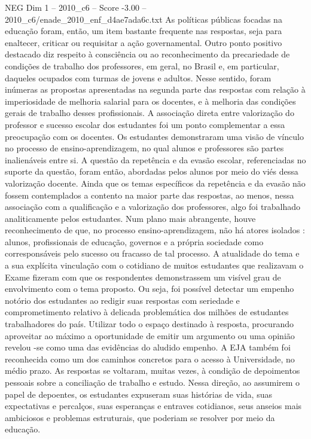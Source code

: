 \begin{textsample}{NEG Dim 1 – 2010\_c6 – Score -3.00 – 2010\_c6/enade\_2010\_enf\_d4ae7ada6c.txt}
As políticas públicas focadas na educação foram, então, um item bastante frequente nas respostas, seja para enaltecer, criticar ou requisitar a ação governamental.
Outro ponto positivo destacado diz respeito à consciência ou ao reconhecimento da precariedade de condições de trabalho dos professores, em geral, no Brasil e, em particular, daqueles ocupados com turmas de jovens e adultos.
Nesse sentido, foram inúmeras as propostas apresentadas na segunda parte das respostas com relação à imperiosidade de melhoria salarial para os docentes, e à melhoria das condições gerais de trabalho desses profissionais.
A associação direta entre valorização do professor e sucesso escolar dos estudantes foi um ponto complementar a essa preocupação com os docentes.
Os estudantes demonstraram uma visão de vínculo no processo de ensino-aprendizagem, no qual alunos e professores são partes inalienáveis entre si.
A questão da repetência e da evasão escolar, referenciadas no suporte da questão, foram então, abordadas pelos alunos por meio do viés dessa valorização docente.
Ainda que os temas específicos da repetência e da evasão não fossem contemplados a contento na maior parte das respostas, ao menos, nessa associação com a qualificação e a valorização dos professores, algo foi trabalhado analiticamente pelos estudantes.
Num plano mais abrangente, houve reconhecimento de que, no processo ensino-aprendizagem, não há atores isolados : alunos, profissionais de educação, governos e a própria sociedade como corresponsáveis pelo sucesso ou fracasso de tal processo.
A atualidade do tema e a sua explícita vinculação com o cotidiano de muitos estudantes que realizavam o Exame fizeram com que os respondentes demonstrassem um visível grau de envolvimento com o tema proposto.
Ou seja, foi possível detectar um empenho notório dos estudantes ao redigir suas respostas com seriedade e comprometimento relativo à delicada problemática dos milhões de estudantes trabalhadores do país.
Utilizar todo o espaço destinado à resposta, procurando aproveitar ao máximo a oportunidade de emitir um argumento ou uma opinião revelou -se como uma das evidências do aludido empenho.
A EJA também foi reconhecida como um dos caminhos concretos para o acesso à Universidade, no médio prazo.
As respostas se voltaram, muitas vezes, à condição de depoimentos pessoais sobre a conciliação de trabalho e estudo.
Nessa direção, ao assumirem o papel de depoentes, os estudantes expuseram suas histórias de vida, suas expectativas e percalços, suas esperanças e entraves cotidianos, seus anseios mais ambiciosos e problemas estruturais, que poderiam se resolver por meio da educação.

\end{textsample}
